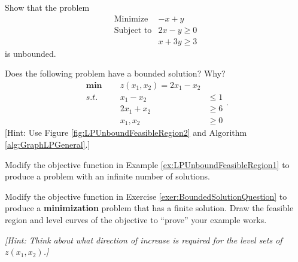 \begin{ex} \label{ex:lp-unbounded}
Show that the problem
\[
\begin{array}{rl}
\text{Minimize} & -x + y \\
\text{Subject to} &  2x - y \geq 0 \\
& x + 3y \geq 3
\end{array}
\]
is unbounded.
\end{ex}



\begin{ex}{}{} Does the following problem have a bounded solution? Why?
\begin{equation}
\begin{aligned}
\boldsymbol{\min}\;\;&& z(x_1,x_2) = 2x_1 - x_2\\
s.t.\;\;&& x_1 - x_2 &\leq 1\\
&& 2x_1 + x_2 &\geq 6\\
&&x_1,x_2 &\geq 0
\end{aligned}.
\end{equation}
[Hint: Use Figure \ref{fig:LPUnboundFeasibleRegion2} and Algorithm \ref{alg:GraphLPGeneral}.]
\label{exer:BoundedSolutionQuestion}
\end{ex}

\begin{ex}{}{} Modify the objective function in Example \ref{ex:LPUnboundFeasibleRegion1} to produce a problem with an infinite number of solutions. 
\end{ex}

\begin{ex}{}{} Modify the objective function in Exercise \ref{exer:BoundedSolutionQuestion} to produce a \textbf{minimization} problem that has a finite solution. Draw the feasible region and level curves of the objective to ``prove'' your example works. 

\emph{[Hint: Think about what direction of increase is required for the level sets of $z(x_1,x_2)$.]}
\end{ex}


